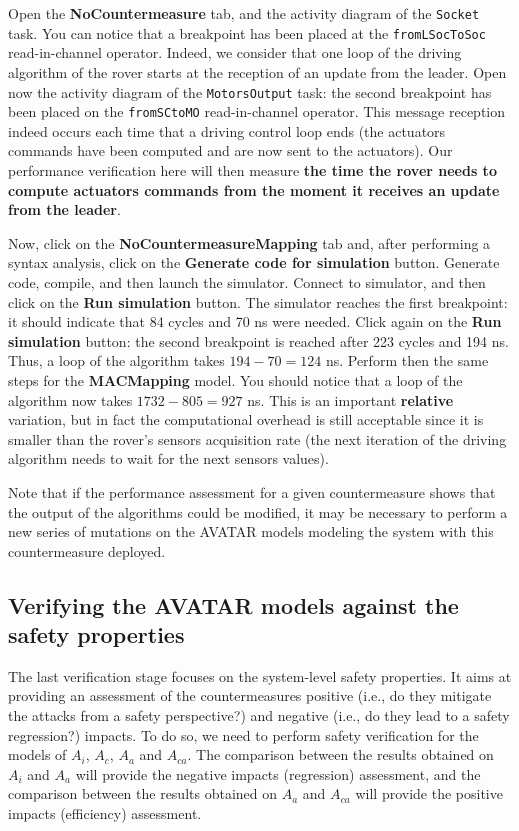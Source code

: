 \documentclass{article}
\begin{document}
Open the \textbf{NoCountermeasure} tab, and the activity diagram of the \texttt{Socket} task. You can notice that a breakpoint has been placed at the \texttt{fromLSocToSoc} read-in-channel operator. Indeed, we consider that one loop of the driving algorithm of the rover starts at the reception of an update from the leader. Open now the activity diagram of the \texttt{MotorsOutput} task: the second breakpoint has been placed on the \texttt{fromSCtoMO} read-in-channel operator. This message reception indeed occurs each time that a driving control loop ends (the actuators commands have been computed and are now sent to the actuators). Our performance verification here will then measure \textbf{the time the rover needs to compute actuators commands from the moment it receives an update from the leader}.

Now, click on the \textbf{NoCountermeasureMapping} tab and, after performing a syntax analysis, click on the \textbf{Generate code for simulation} button. Generate code, compile, and then launch the simulator. Connect to simulator, and then click on the \textbf{Run simulation} button. The simulator reaches the first breakpoint: it should indicate that 84 cycles and 70 ns were needed. Click again on the \textbf{Run simulation} button: the second breakpoint is reached after 223 cycles and 194 ns. Thus, a loop of the algorithm takes $194 - 70 = 124$ ns. Perform then the same steps for the \textbf{MACMapping} model. You should notice that a loop of the algorithm now takes $1732 - 805 = 927$ ns. This is an important \textbf{relative} variation, but in fact the computational overhead is still acceptable since it is smaller than the rover's sensors acquisition rate (the next iteration of the driving algorithm needs to wait for the next sensors values).

Note that if the performance assessment for a given countermeasure shows that the output of the algorithms could be modified, it may be necessary to perform a new series of mutations on the AVATAR models modeling the system with this countermeasure deployed.


\subsection{Verifying the AVATAR models against the safety properties}

The last verification stage focuses on the system-level safety properties. It aims at providing an assessment of the countermeasures positive (i.e., do they mitigate the attacks from a safety perspective?) and negative (i.e., do they lead to a safety regression?) impacts. To do so, we need to perform safety verification for the models of $A_i$, $A_c$, $A_a$ and $A_{c a}$. The comparison between the results obtained on $A_i$ and $A_a$ will provide the negative impacts (regression) assessment, and the comparison between the results obtained on $A_a$ and $A_{c a}$ will provide the positive impacts (efficiency) assessment.
\end{document}
